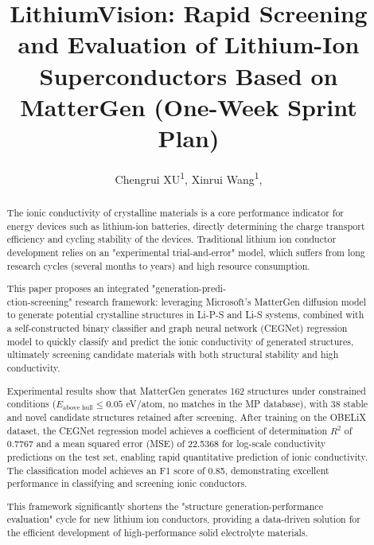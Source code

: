 \documentclass[letterpaper]{article} %
\title{LithiumVision: Rapid Screening and Evaluation of Lithium-Ion Superconductors Based on MatterGen (One-Week Sprint Plan)}
\author{
    Chengrui XU\textsuperscript{\rm 1}\equalcontrib,
    Xinrui Wang\textsuperscript{\rm 1}\equalcontrib,
}
\begin{document}
\raggedbottom
\maketitle

\begin{abstract}
The ionic conductivity of crystalline materials is a core performance indicator for energy devices such as lithium-ion batteries, directly determining the charge transport efficiency and cycling stability of the devices. Traditional lithium ion conductor development relies on an "experimental trial-and-error" model, which suffers from long research cycles (several months to years) and high resource consumption.

This paper proposes an integrated "generation-predi-\\
ction-screening" research framework:
leveraging Microsoft's MatterGen diffusion model to generate potential crystalline 
structures in Li-P-S and Li-S systems, combined with a self-constructed binary classifier 
and graph neural network (CEGNet) regression model to quickly classify and predict 
the ionic conductivity of generated structures, ultimately screening candidate materials 
with both structural stability and high conductivity.

Experimental results show that MatterGen generates 162 structures under constrained conditions ($E_{\text{above hull}} \leq 0.05$ eV/atom, no matches in the MP database), with 38 stable and novel candidate structures retained after screening. After training on the OBELiX dataset, the CEGNet regression model achieves a coefficient of determination $R^2$ of 0.7767 and a mean squared error (MSE) of 22.5368 for log-scale conductivity predictions on the test set, enabling rapid quantitative prediction of ionic conductivity. The classification model achieves an F1 score of 0.85, demonstrating excellent performance in classifying and screening ionic conductors.

This framework significantly shortens the "structure generation-performance evaluation" cycle for new lithium ion conductors, providing a data-driven solution for the efficient development of high-performance solid electrolyte materials.

\end{abstract}


\begin{links}
\end{links}
\end{document}
